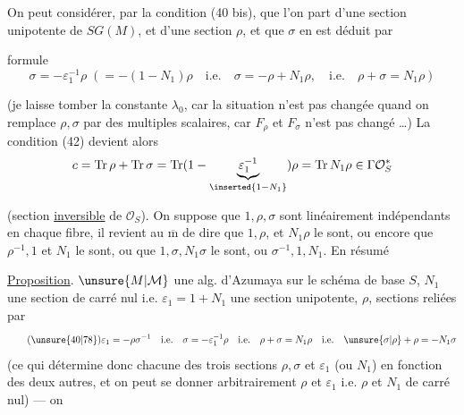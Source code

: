 \uline{} On peut considérer, par la condition (40 bis), que l'on part d'une section   unipotente de $SG(M)$, et d'une section $\rho$, et que $\sigma$ en est déduit par 


formule
\[
\tag{77}
\sigma=-\varepsilon_1^{-1}\rho\;\left(=-(1-N_1)\rho\quad\mathrm{i.e.}\quad\sigma=-\rho+N_1\rho,\quad\mathrm{i.e.}\quad\rho+\sigma=N_1\rho\right)
\]


(je laisse tomber la constante  $\lambda_0$, car  la situation n'est pas changée quand on remplace $\rho,\sigma$ par des multiples scalaires, car $F_\rho$ et $F_\sigma$ n'est pas changé \ldots) La condition (42) devient alors
\[
c=\operatorname{Tr}\rho+\operatorname{Tr}\sigma=\operatorname{Tr}(1-\underbrace{\varepsilon_1^{-1}}_{\inserted{1-N_1}})\rho=\operatorname{Tr}N_1\rho\in\Gamma\mathcal O_S^*
\]


(section \uline{inversible} de $\mathcal O_S$). On suppose que $1,\rho,\sigma$ sont linéairement indépendants en chaque fibre, il revient au $\overline{\mathrm m}$ de dire que $1,\rho$, et $N_1\rho$ le sont, ou encore que $\rho^{-1},1$ et $N_1$ le sont, ou que $1,\sigma,N_1\sigma$ le sont, ou $\sigma^{-1},1,N_1$. En résumé


\uline{Proposition}.  $\unsure{M|\mathcal M}$ une alg. d'Azumaya sur le schéma de base $S$, $N_1$ une section de carré nul  i.e. $\varepsilon_1=1+N_1$ une section unipotente, $\rho$, \inserted{$\sigma$}   sections reliées par
\[
\tag{\unsure{40|78}}
\varepsilon_1=-\rho\sigma^{-1}\quad\mathrm{i.e.}\quad\sigma=-\varepsilon_1^{-1}\rho\quad\mathrm{i.e.}\quad\rho+\sigma=N_1\rho\quad\mathrm{i.e.}\quad\unsure{\sigma|\rho}+\rho=-N_1\sigma
\]
 (ce qui détermine donc chacune des trois sections  $\rho,\sigma$ et $\varepsilon_1$ (ou $N_1$) en fonction des deux autres, et on peut se donner arbitrairement $\rho$ et  $\varepsilon_1$ i.e. $\rho$ et $N_1$ de carré nul) --- on
